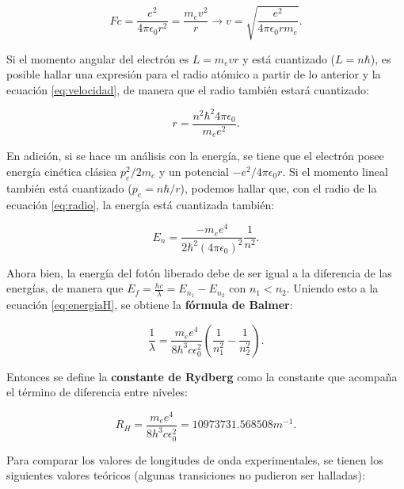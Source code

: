 \documentclass[%
 reprint,
 amsmath,amssymb,
 aps,
]{revtex4-1}
\begin{document}
\begin{equation}
    Fc=\frac{e^2}{4\pi\epsilon_0 r^2}=\frac{m_ev^2}{r}\rightarrow v=\sqrt{\frac{e^2}{4\pi \epsilon_0 rm_e}}.
    \label{eq:velocidad}
\end{equation}

Si el momento angular del electrón es $L=m_evr$ y está cuantizado ($L=n\hbar$), es posible hallar una expresión para el radio atómico a partir de lo anterior y la ecuación \ref{eq:velocidad}, de manera que el radio también estará cuantizado:

\begin{equation}
    r=\frac{n^2\hbar^2 4\pi\epsilon_0}{m_ee^2}.
    \label{eq:radio}
\end{equation}

En adición, si se hace un análisis con la energía, se tiene que el electrón posee energía cinética clásica $p_e^2/2m_e$ y un potencial $-e^2/4\pi\epsilon_0r$. Si el momento lineal también está cuantizado ($p_e=n\hbar/r$), podemos hallar que, con el radio de la ecuación \ref{eq:radio}, la energía está cuantizada también:

\begin{equation}
    E_n=\frac{-m_ee^4}{2\hbar^2(4\pi\epsilon_0)^2}\frac{1}{n^2}.
    \label{eq:energiaH}
\end{equation}

Ahora bien, la energía del fotón liberado debe de ser igual a la diferencia de las energías, de manera que $E_f=\frac{hc}{\lambda}=E_{n_1}-E_{n_2}$ con $n_1 < n_2$. Uniendo esto a la ecuación \ref{eq:energiaH}, se obtiene la \textbf{fórmula de Balmer}:

\begin{equation}
    \frac{1}{\lambda}=\frac{m_ee^4}{8h^3c\epsilon_0^2}(\frac{1}{n_1^2}-\frac{1}{n_2^2}).
    \label{eq:Balmer}
\end{equation}

Entonces se define la \textbf{constante de Rydberg} como la constante que acompaña el término de diferencia entre niveles:

\begin{equation}
    R_H=\frac{m_ee^4}{8h^3c\epsilon_0^2}=10973731.568508 m^{-1}.
    \label{eq:Rydberg}
\end{equation}

Para comparar los valores de longitudes de onda experimentales, se tienen los siguientes valores teóricos (algunas transiciones no pudieron ser halladas):
\end{document}
